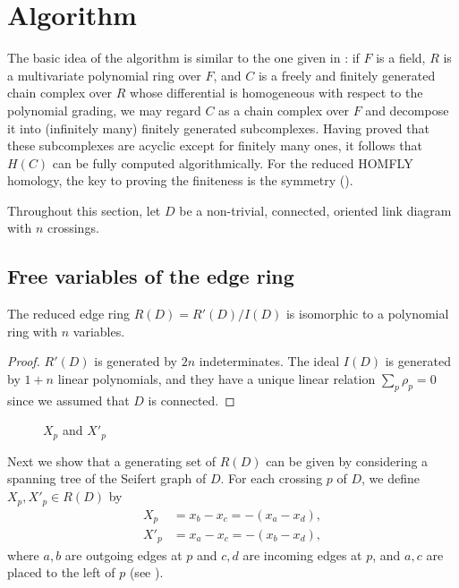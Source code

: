 \section{Algorithm} \label{sec:algo}

The basic idea of the algorithm is similar to the one given in \cite{sano-sato:2020}: if $F$ is a field, $R$ is a multivariate polynomial ring over $F$, and $C$ is a freely and finitely generated chain complex over $R$ whose differential is homogeneous with respect to the polynomial grading, we may regard $C$ as a chain complex over $F$ and decompose it into (infinitely many) finitely generated subcomplexes. Having proved that these subcomplexes are acyclic except for finitely many ones, it follows that $H(C)$ can be fully computed algorithmically. For the reduced HOMFLY homology, the key to proving the finiteness is the symmetry ().

Throughout this section, let $D$ be a non-trivial, connected, oriented link diagram with $n$ crossings. 

\subsection{Free variables of the edge ring}

\begin{lemma}\label{dimlem}
    The reduced edge ring $R(D) = R'(D)/I(D)$ is isomorphic to a polynomial ring with $n$ variables.
\end{lemma}

\begin{proof}
    $R'(D)$ is generated by $2n$ indeterminates. The ideal $I(D)$ is generated by $1+n$ linear polynomials, and they have a unique linear relation $\sum_p \rho_p = 0$ since we assumed that $D$ is connected.
\end{proof}

\begin{figure}
    \centering
    
    \caption{$X_{p}$ and $X'_{p}$}
    \label{fig:crossing}
\end{figure}

Next we show that a generating set of $R(D)$ can be given by considering a spanning tree of the Seifert graph of $D$.
For each crossing $p$ of $D$, we define $X_{p}, X'_{p} \in R(D)$ by
\begin{align*}
    X_p &= x_b - x_c = -(x_a - x_d), \\
    X'_p &= x_a - x_c = -(x_b - x_d),
\end{align*}
where $a, b$ are outgoing edges at $p$ and $c,d$ are incoming edges at $p$, and $a, c$ are placed to the left of $p$ (see ).

